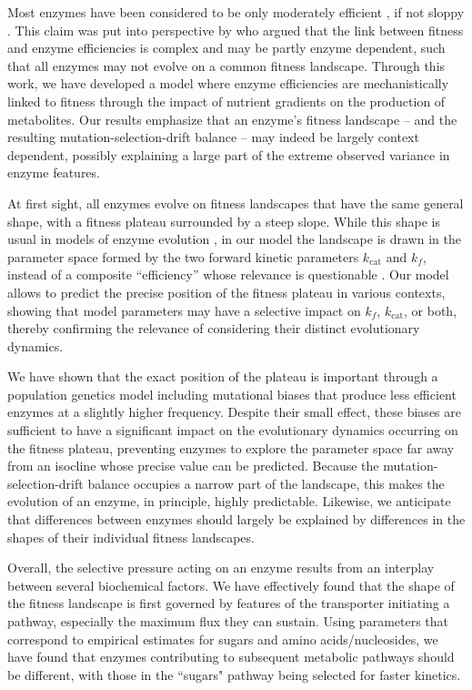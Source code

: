 \documentclass[11pt,onecolumn]{article}
\begin{document}
Most enzymes have been considered to be only moderately efficient \citep{Bar-Even11}, if not sloppy \citep{Bar-Even15}. This claim was put into perspective by \citet{Newton18} who argued that the link between fitness and enzyme efficiencies is complex and may be partly enzyme dependent, such that all enzymes may not evolve on a common fitness landscape. Through this work, we have developed a model where enzyme efficiencies are mechanistically linked to fitness through the impact of nutrient gradients on the production of metabolites. Our results emphasize that an enzyme's fitness landscape -- and the resulting mutation-selection-drift balance -- may indeed be largely context dependent, possibly explaining a large part of the extreme observed variance in enzyme features.

At first sight, all enzymes evolve on fitness landscapes that have the same general shape, with a fitness plateau surrounded by a steep slope. While this shape is usual in models of enzyme evolution \citep{Hartl85,Kaltenbach14,Yi19}, in our model the landscape is drawn in the parameter space formed by the two forward kinetic parameters $k_\text{cat}$ and $k_f$, instead of a composite ``efficiency'' whose relevance is questionable \citep{Eisenthal07,Koshland02}. Our model allows to predict the precise position of the fitness plateau in various contexts, showing that model parameters may have a selective impact on $k_f$, $k_\text{cat}$, or both, thereby confirming the relevance of considering their distinct evolutionary dynamics. 

We have shown that the exact position of the plateau is important through a population genetics model including mutational biases that produce less efficient enzymes at a slightly higher frequency. Despite their small effect, these biases are sufficient to have a significant impact on the evolutionary dynamics occurring on the fitness plateau, preventing enzymes to explore the parameter space far away from an isocline whose precise value can be predicted. Because the mutation-selection-drift balance occupies a narrow part of the landscape, this makes the evolution of an enzyme, in principle, highly predictable. Likewise, we anticipate that differences between enzymes should largely be explained by differences in the shapes of their individual fitness landscapes. 

Overall, the selective pressure acting on an enzyme results from an interplay between several biochemical factors. We have effectively found that the shape of the fitness landscape is first governed by features of the transporter initiating a pathway, especially the maximum flux they can sustain. Using parameters that correspond to empirical estimates for sugars and amino acids/nucleosides, we have found that enzymes contributing to subsequent metabolic pathways should be different, with those in the ``sugars" pathway being selected for faster kinetics.
\end{document}
